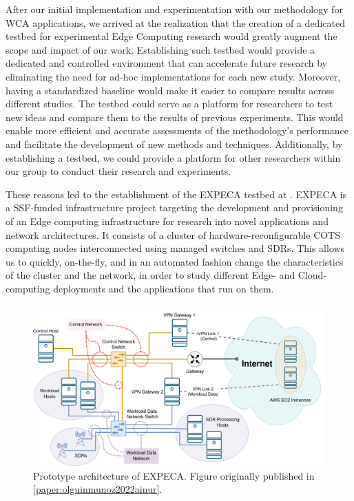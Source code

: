 After our initial implementation and experimentation with our methodology for \gls{WCA} applications, we arrived at the realization that the creation of a dedicated testbed for experimental Edge Computing research would greatly augment the scope and impact of our work.
Establishing such testbed would provide a dedicated and controlled environment that can accelerate future research by eliminating the need for ad-hoc implementations for each new study.
Moreover, having a standardized baseline would make it easier to compare results across different studies.
The testbed could serve as a platform for researchers to test new ideas and compare them to the results of previous experiments.
This would enable more efficient and accurate assessments of the methodology's performance and facilitate the development of new methods and techniques.
Additionally, by establishing a testbed, we could provide a platform for other researchers within our group to conduct their research and experiments.

These reasons led to the establishment of the \gls{EXPECA} testbed at .
\gls{EXPECA} is a \gls{SSF}-funded infrastructure project targeting the development and provisioning of an Edge computing infrastructure for research into novel applications and network architectures.
It consists of a cluster of hardware-reconfigurable \gls{COTS} computing nodes interconnected using managed switches and \glspl{SDR}.
This allows us to quickly, on-the-fly, and in an automated fashion change the characteristics of the cluster and the network, in order to study different Edge- and Cloud-computing deployments and the applications that run on them.

\begin{figure}
    \centering
    \includegraphics[width=.9\textwidth]{publications/2022Ainur/figures/network}
    \caption{
        Prototype architecture of \acs{EXPECA}.
        Figure originally published in \cref{paper:olguinmunoz2022ainur}.
    }\label{fig:expeca}
\end{figure}

